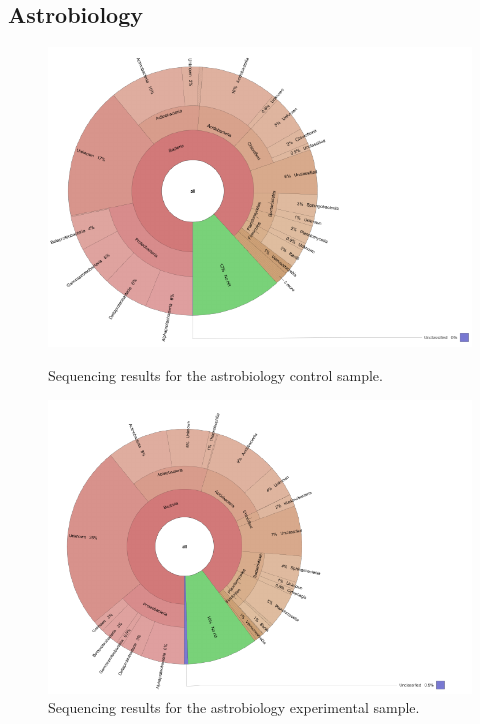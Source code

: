 \newpage
\subsection{Astrobiology}
\label{sec:Astrobiology-Results}

	\begin{figure}[H]
	\begin{center}
	\begin{minipage}[c]{.75\textwidth}
	\includegraphics[width=1.2\textwidth]{./Figures/ConKrona.pdf}
	\caption{Sequencing results for the astrobiology control sample.}
	\label{fig:astro_hits1}
	\end{minipage}
	\hfill
	\begin{minipage}[c]{.75\textwidth}
	\includegraphics[width=1.2\textwidth]{./Figures/ExpKrona.pdf}
	\caption{Sequencing results for the astrobiology experimental sample.}
	\label{fig:astro_hits2}
	\end{minipage}
	\end{center}
	\end{figure} 
	
